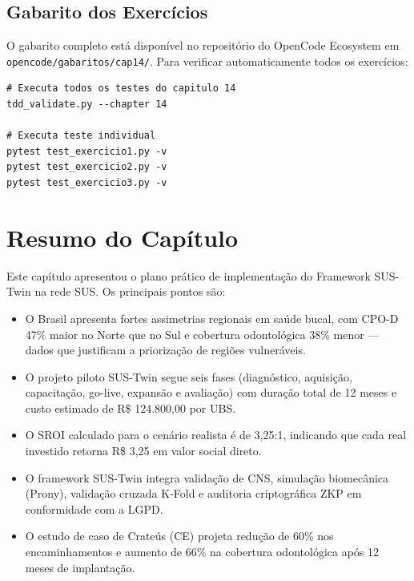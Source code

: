 \subsection{Gabarito dos Exercícios}

O gabarito completo está disponível no repositório do OpenCode
Ecosystem em \texttt{opencode/gabaritos/cap14/}. Para verificar
automaticamente todos os exercícios:

\begin{lstlisting}[style=bashstyle, caption={Verificação automática dos exercícios do Capítulo 14}, label={lst:run_tests}]
# Executa todos os testes do capitulo 14
tdd_validate.py --chapter 14

# Executa teste individual
pytest test_exercicio1.py -v
pytest test_exercicio2.py -v
pytest test_exercicio3.py -v
\end{lstlisting}

\section*{Resumo do Capítulo}
\label{sec:resumo14}

Este capítulo apresentou o plano prático de implementação do Framework
SUS-Twin na rede SUS. Os principais pontos são:

\begin{itemize}
    \item O Brasil apresenta fortes assimetrias regionais em saúde
        bucal, com CPO-D 47\% maior no Norte que no Sul e cobertura
        odontológica 38\% menor — dados que justificam a priorização
        de regiões vulneráveis.
    \item O projeto piloto SUS-Twin segue seis fases (diagnóstico,
        aquisição, capacitação, go-live, expansão e avaliação) com
        duração total de 12 meses e custo estimado de
        R\$ 124.800,00 por UBS.
    \item O SROI calculado para o cenário realista é de 3,25:1,
        indicando que cada real investido retorna R\$ 3,25 em valor
        social direto.
    \item O framework SUS-Twin integra validação de CNS, simulação
        biomecânica (Prony), validação cruzada K-Fold e auditoria
        criptográfica ZKP em conformidade com a LGPD.
    \item O estudo de caso de Crateús (CE) projeta redução de 60\%
        nos encaminhamentos e aumento de 66\% na cobertura
        odontológica após 12 meses de implantação.
\end{itemize}

